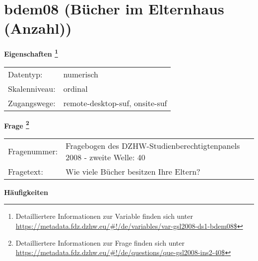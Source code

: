 
    \setcounter{footnote}{0}

    \vspace*{-1.8cm}
	\section{bdem08 (Bücher im Elternhaus (Anzahl))}
	\label{section:bdem08}



    \vspace*{0.5cm}
    \noindent\textbf{Eigenschaften
	\footnote{Detailliertere Informationen zur Variable finden sich unter
		\url{https://metadata.fdz.dzhw.eu/\#!/de/variables/var-gsl2008-ds1-bdem08$}}}\\
	\begin{tabularx}{\hsize}{@{}lX}
	Datentyp: & numerisch \\
	Skalenniveau: & ordinal \\
	Zugangswege: &
	  remote-desktop-suf, 
	  onsite-suf
 \\
    \end{tabularx}



				\vspace*{0.5cm}
                \noindent\textbf{Frage
	                \footnote{Detailliertere Informationen zur Frage finden sich unter
		              \url{https://metadata.fdz.dzhw.eu/\#!/de/questions/que-gsl2008-ins2-40$}}}\\
				\begin{tabularx}{\hsize}{@{}lX}
					Fragenummer: &
					  Fragebogen des DZHW-Studienberechtigtenpanels 2008 - zweite Welle:
					  40
 \\
					Fragetext: & Wie viele Bücher besitzen Ihre Eltern? \\
				\end{tabularx}





        		\vspace*{0.5cm}
                \noindent\textbf{Häufigkeiten}

